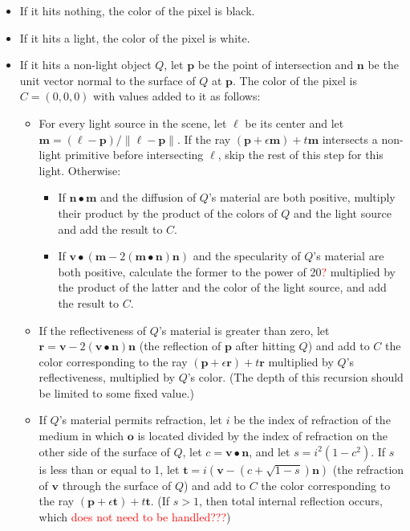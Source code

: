 \documentclass{article}
\newcommand{\comm}{\textcolor{red}}  %
\renewcommand{\v}{\mathbf}
\begin{document}
\begin{itemize}
\item If it hits nothing, the color of the pixel is black.
\item If it hits a light, the color of the pixel is white.
\item If it hits a non-light object $Q$, let $\v{p}$ be the point of intersection and $\v{n}$ be the unit vector normal to the surface of $Q$ at $\v{p}$.  The color of the pixel is $C = (0, 0, 0)$ with values added to it as follows:
 \begin{itemize}
 \item For every light source in the scene, let $\v{\ell}$ be its center and let $\v{m}=(\v{\ell}-\v{p})/\|\v{\ell}-\v{p}\|$.  If the ray $(\v{p}+\epsilon\v{m})+t\v{m}$ intersects a non-light primitive before intersecting $\ell$, skip the rest of this step for this light.  Otherwise:
  \begin{itemize}
  \item If $\v{n}\bullet\v{m}$ and the diffusion of $Q$'s material are both positive, multiply their product by the product of the colors of $Q$ and the light source and add the result to $C$.
  \item If $\v{v}\bullet(\v{m} - 2(\v{m}\bullet\v{n})\v{n})$ and the specularity of $Q$'s material are both positive, calculate the former to the power of 20\comm{?} multiplied by the product of the latter and the color of the light source, and add the result to $C$.
  \end{itemize}
 \item If the reflectiveness of $Q$'s material is greater than zero, let $\v{r} = \v{v} - 2(\v{v}\bullet\v{n})\v{n}$ (the reflection of $\v{p}$ after hitting $Q$) and add to $C$ the color corresponding to the ray $(\v{p}+\epsilon\v{r})+t\v{r}$ multiplied by $Q$'s reflectiveness, multiplied by $Q$'s color.  (The depth of this recursion should be limited to some fixed value.)
 \item If $Q$'s material permits refraction, let $i$ be the index of refraction of the medium in which $\v{o}$ is located divided by the index of refraction on the other side of the surface of $Q$, let $c = \v{v}\bullet\v{n}$, and let $s = i^2(1-c^2)$.  If $s$ is less than or equal to 1, let $\v{t} = i(\v{v} - (c+\sqrt{1-s})\v{n})$ (the refraction of $\v{v}$ through the surface of $Q$) and add to $C$ the color corresponding to the ray $(\v{p}+\epsilon\v{t})+t\v{t}$.  (If $s>1$, then total internal reflection occurs, which \comm{does not need to be handled???})
 \end{itemize}
\end{itemize}
\end{document}
